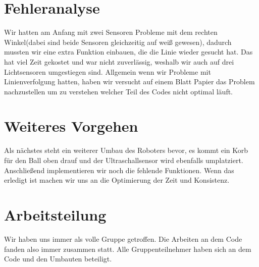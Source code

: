 \documentclass[11pt]{article}
\begin{document}
\section{Fehleranalyse}
Wir hatten am Anfang mit zwei Sensoren Probleme mit dem rechten Winkel(dabei sind beide Sensoren gleichzeitig auf weiß gewesen), dadurch mussten wir eine extra Funktion einbauen, die die Linie wieder gesucht hat. Das hat viel Zeit gekostet und war nicht zuverlässig, weshalb wir auch auf drei Lichtsensoren umgestiegen sind. Allgemein wenn wir Probleme mit Linienverfolgung hatten, haben wir versucht auf einem Blatt Papier das Problem nachzustellen um zu verstehen welcher Teil des Codes nicht optimal läuft.

\section{Weiteres Vorgehen}
Als nächstes steht ein weiterer Umbau des Roboters bevor, es kommt ein Korb für den Ball oben drauf und der Ultraschallsensor wird ebenfalls umplatziert. Anschließend implementieren wir noch die fehlende Funktionen. Wenn das erledigt ist machen wir uns an die Optimierung der Zeit und Konsistenz.

\section{Arbeitsteilung}
Wir haben uns immer als volle Gruppe getroffen. Die Arbeiten an dem Code fanden also immer zusammen statt. Alle Gruppenteilnehmer haben sich an dem Code und den Umbauten beteiligt.
\end{document}
